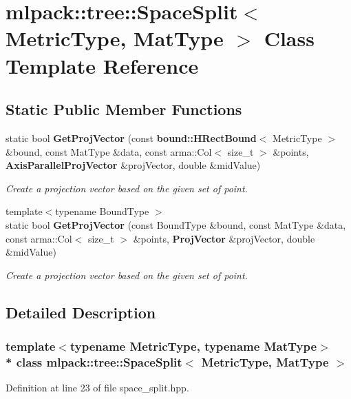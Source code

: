 \section{mlpack\+:\+:tree\+:\+:Space\+Split$<$ Metric\+Type, Mat\+Type $>$ Class Template Reference}
\label{classmlpack_1_1tree_1_1SpaceSplit}
\subsection*{Static Public Member Functions}
\begin{DoxyCompactItemize}
\item 
static bool {\bf Get\+Proj\+Vector} (const {\bf bound\+::\+H\+Rect\+Bound}$<$ Metric\+Type $>$ \&bound, const Mat\+Type \&data, const arma\+::\+Col$<$ size\+\_\+t $>$ \&points, {\bf Axis\+Parallel\+Proj\+Vector} \&proj\+Vector, double \&mid\+Value)
\begin{DoxyCompactList}\small\item\em Create a projection vector based on the given set of point. \end{DoxyCompactList}\item 
{\footnotesize template$<$typename Bound\+Type $>$ }\\static bool {\bf Get\+Proj\+Vector} (const Bound\+Type \&bound, const Mat\+Type \&data, const arma\+::\+Col$<$ size\+\_\+t $>$ \&points, {\bf Proj\+Vector} \&proj\+Vector, double \&mid\+Value)
\begin{DoxyCompactList}\small\item\em Create a projection vector based on the given set of point. \end{DoxyCompactList}\end{DoxyCompactItemize}


\subsection{Detailed Description}
\subsubsection*{template$<$typename Metric\+Type, typename Mat\+Type$>$\\*
class mlpack\+::tree\+::\+Space\+Split$<$ Metric\+Type, Mat\+Type $>$}



Definition at line 23 of file space\+\_\+split.\+hpp.



